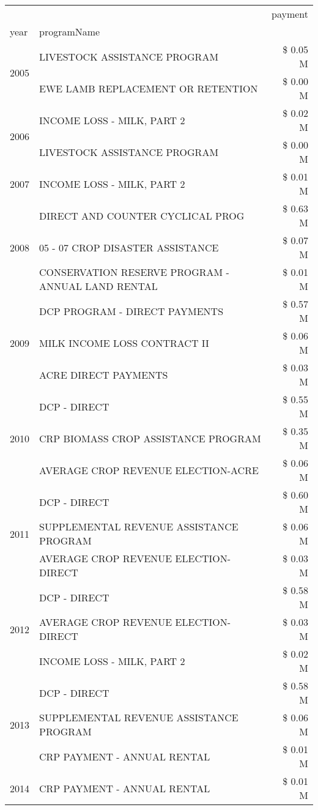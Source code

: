\begin{tabular}{llr}
\toprule
 &  & payment \\
year & programName &  \\
\midrule
\multirow[t]{2}{*}{2005} & LIVESTOCK ASSISTANCE PROGRAM & \$ 0.05 M \\
 & EWE LAMB REPLACEMENT OR RETENTION & \$ 0.00 M \\
\cline{1-3}
\multirow[t]{2}{*}{2006} & INCOME LOSS - MILK, PART 2 & \$ 0.02 M \\
 & LIVESTOCK ASSISTANCE PROGRAM & \$ 0.00 M \\
\cline{1-3}
2007 & INCOME LOSS - MILK, PART 2 & \$ 0.01 M \\
\cline{1-3}
\multirow[t]{3}{*}{2008} & DIRECT AND COUNTER CYCLICAL PROG & \$ 0.63 M \\
 & 05 - 07 CROP DISASTER ASSISTANCE & \$ 0.07 M \\
 & CONSERVATION RESERVE PROGRAM - ANNUAL LAND RENTAL & \$ 0.01 M \\
\cline{1-3}
\multirow[t]{3}{*}{2009} & DCP PROGRAM - DIRECT PAYMENTS & \$ 0.57 M \\
 & MILK INCOME LOSS CONTRACT II & \$ 0.06 M \\
 & ACRE DIRECT PAYMENTS & \$ 0.03 M \\
\cline{1-3}
\multirow[t]{3}{*}{2010} & DCP - DIRECT & \$ 0.55 M \\
 & CRP BIOMASS CROP ASSISTANCE PROGRAM & \$ 0.35 M \\
 & AVERAGE CROP REVENUE ELECTION-ACRE & \$ 0.06 M \\
\cline{1-3}
\multirow[t]{3}{*}{2011} & DCP - DIRECT & \$ 0.60 M \\
 & SUPPLEMENTAL REVENUE ASSISTANCE PROGRAM & \$ 0.06 M \\
 & AVERAGE CROP REVENUE ELECTION-DIRECT & \$ 0.03 M \\
\cline{1-3}
\multirow[t]{3}{*}{2012} & DCP - DIRECT & \$ 0.58 M \\
 & AVERAGE CROP REVENUE ELECTION-DIRECT & \$ 0.03 M \\
 & INCOME LOSS - MILK, PART 2 & \$ 0.02 M \\
\cline{1-3}
\multirow[t]{3}{*}{2013} & DCP - DIRECT & \$ 0.58 M \\
 & SUPPLEMENTAL REVENUE ASSISTANCE PROGRAM & \$ 0.06 M \\
 & CRP PAYMENT - ANNUAL RENTAL & \$ 0.01 M \\
\cline{1-3}
\multirow[t]{3}{*}{2014} & CRP PAYMENT - ANNUAL RENTAL & \$ 0.01 M \\

\end{tabular}
